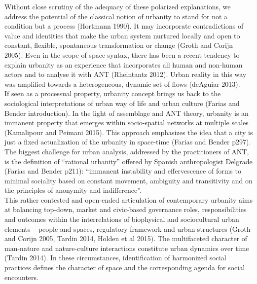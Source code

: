 \documentclass[11pt]{report}
\begin{document}
Without close scrutiny of the adequacy of these polarized explanations, we address the potential of the classical notion of urbanity to stand for not a condition but a process (Hortmann 1990). It may incorporate contradictions of value and identities that make the urban system nurtured locally and open to constant, flexible, spontaneous transformation or change (Groth and Corijn 2005). Even in the scope of space syntax, there has been a recent tendency to explain urbanity as an experience that incorporates all human and non-human actors and to analyse it with ANT (Rheintantz 2012). Urban reality in this way was amplified towards a heterogeneous, dynamic set of flows (deAguiar 2013).
\\
If seen as a processual property, urbanity concept brings us back to the sociological interpretations of urban way of life and urban culture (Farias and Bender introduction). In the light of assemblage and ANT theory,  urbanity is an immanent property that emerges within socio-spatial networks at multiple scales (Kamalipour and Peimani 2015). This approach emphasizes the idea that a city is just a fixed actualization of the urbanity in space-time (Farias and Bender p297). The biggest challenge for urban analysis, addressed by the practitioners of ANT, is the definition of “rational urbanity” offered by Spanish anthropologist Delgrade (Farias and Bender p211): “immanent instability and effervescence of forms to minimal sociality based on constant movement, ambiguity and transitivity and on the principles of anonymity and indifference”.
\\
This rather contested and open-ended articulation of contemporary urbanity aims at balancing top-down, market and civic-based governance roles, responsibilities and outcomes within the interrelations of biophysical and sociocultural urban elements – people and spaces, regulatory framework and urban structures (Groth and Corijn 2005, Tardin 2014, Holden et al 2015). The multifaceted character of man-nature and nature-culture interactions constitute urban dynamics over time (Tardin 2014). In these circumstances, identification of harmonized social practices defines the character of space and the corresponding agenda for social encounters. 
\\
\end{document}
